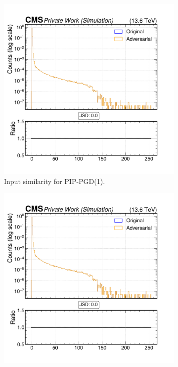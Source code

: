 \begin{figure}[htbp]
  \centering
  \begin{subfigure}[t]{0.32\textwidth}
    \includegraphics[width=\linewidth]{media/output/features/compare/combined_it_1/cmp_cpf_arr_Cpfcan_chi2.pdf}
    \caption*{Input similarity for PIP-PGD(1).}
  \end{subfigure}\hfill
  \begin{subfigure}[t]{0.32\textwidth}
    \includegraphics[width=\linewidth]{media/output/features/compare/combined_it_2/cmp_cpf_arr_Cpfcan_chi2.pdf}

\end{subfigure}
\end{figure}
